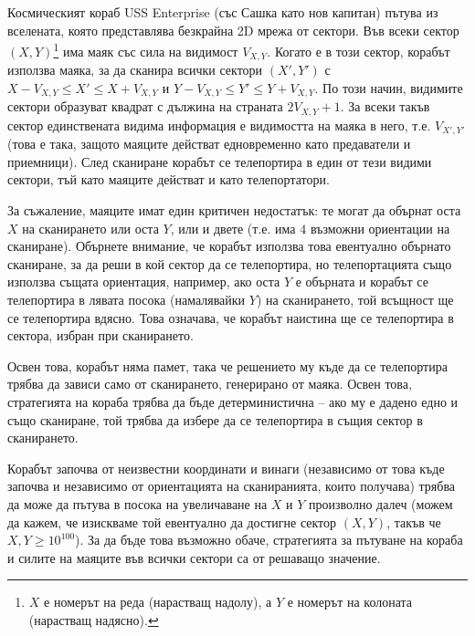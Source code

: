 \documentclass[12pt]{article}
\begin{document}
\renewcommand{\headerLang}{Български}
\renewcommand{\problemName}{AB13. ВИДИМОСТ}

\renewcommand{\headerLeft}{IATI Ден 1, Старша група}
\renewcommand{\headerRightFirst}{XVII INTERNATIONAL ADVANCED TOURNAMENT IN INFORMATICS}
\renewcommand{\headerRightSecond}{ПРОЛЕТНИ СЪСТЕЗАНИЯ ПО ИНФОРМАТИКА, БУРГАС 2026}

\renewcommand{\tl}{$5$ сек.}
\renewcommand{\ml}{$1024$ MB}
\problem{Задача \problemName}

Космическият кораб USS Enterprise (със Сашка като нов капитан) пътува из вселената, която представлява безкрайна 2D мрежа от сектори. Във всеки сектор $(X, Y)$\footnote{$X$ е номерът на реда (нарастващ надолу), а $Y$ е номерът на колоната (нарастващ надясно).} има маяк със сила на видимост $V_{X, Y}$. Когато е в този сектор, корабът използва маяка, за да сканира всички сектори $(X', Y')$ с $X - V_{X, Y} \leq X' \leq X + V_{X, Y}$ и $Y - V_{X, Y} \leq Y' \leq Y + V_{X, Y}$. По този начин, видимите сектори образуват квадрат с дължина на страната $2V_{X, Y} + 1$. За всеки такъв сектор единствената видима информация е видимостта на маяка в него, т.е. $V_{X', Y'}$ (това е така, защото маяците действат едновременно като предаватели и приемници). След сканиране корабът се телепортира в един от тези видими сектори, тъй като маяците действат и като телепортатори.

За съжаление, маяците имат един критичен недостатък: те могат да обърнат оста $X$ на сканирането или оста $Y$, или и двете (т.е. има $4$ възможни ориентации на сканиране). Обърнете внимание, че корабът използва това евентуално обърнато сканиране, за да реши в кой сектор да се телепортира, но телепортацията също използва същата ориентация, например, ако оста $Y$ е обърната и корабът се телепортира в лявата посока (намалявайки $Y$) на сканирането, той всъщност ще се телепортира вдясно. Това означава, че корабът наистина ще се телепортира в сектора, избран при сканирането.

Освен това, корабът няма памет, така че решението му къде да се телепортира трябва да зависи само от сканирането, генерирано от маяка. Освен това, стратегията на кораба трябва да бъде детерминистична -- ако му е дадено едно и също сканиране, той трябва да избере да се телепортира в същия сектор в сканирането.

Корабът започва от неизвестни координати и винаги (независимо от това къде започва и независимо от ориентацията на сканиранията, които получава) трябва да може да пътува в посока на увеличаване на $X$ и $Y$ произволно далеч (можем да кажем, че изискваме той евентуално да достигне сектор $(X, Y)$, такъв че $X, Y \geq 10^{100}$). За да бъде това възможно обаче, стратегията за пътуване на кораба и силите на маяците във всички сектори са от решаващо значение.
\end{document}
